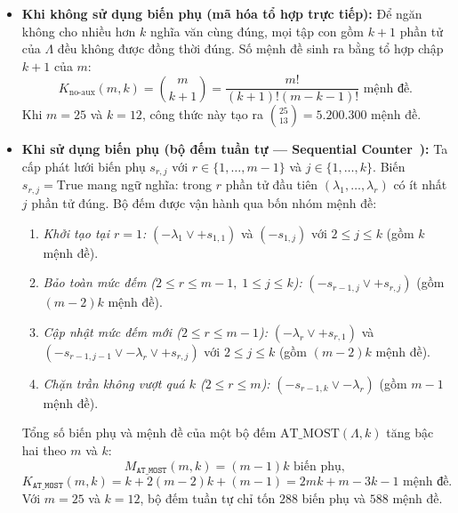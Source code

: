 \begin{itemize}
    \item \textbf{Khi không sử dụng biến phụ (mã hóa tổ hợp trực tiếp):} Để ngăn không cho nhiều hơn $k$ nghĩa văn cùng đúng, mọi tập con gồm $k + 1$ phần tử của $\Lambda$ đều không được đồng thời đúng. Số mệnh đề sinh ra bằng tổ hợp chập $k + 1$ của $m$:
    \begin{equation}
        K_{\text{no-aux}}(m, k) = \binom{m}{k + 1} = \frac{m!}{(k + 1)!(m - k - 1)!} \text{ mệnh đề}.
    \end{equation}
    Khi $m = 25$ và $k = 12$, công thức này tạo ra $\binom{25}{13} = 5.200.300$ mệnh đề.

    \item \textbf{Khi sử dụng biến phụ (bộ đếm tuần tự --- Sequential Counter~\cite{sinz2005towards}):} Ta cấp phát lưới biến phụ $s_{r, j}$ với $r \in \{1, \dots, m - 1\}$ và $j \in \{1, \dots, k\}$. Biến $s_{r, j} = \text{True}$ mang ngữ nghĩa: trong $r$ phần tử đầu tiên $(\lambda_1, \dots, \lambda_r)$ có ít nhất $j$ phần tử đúng. Bộ đếm được vận hành qua bốn nhóm mệnh đề:
    \begin{enumerate}
        \item \textit{Khởi tạo tại $r = 1$:} $(-\lambda_1 \lor +s_{1, 1})$ và $(-s_{1, j})$ với $2 \le j \le k$ (gồm $k$ mệnh đề).
        \item \textit{Bảo toàn mức đếm ($2 \le r \le m - 1,\; 1 \le j \le k$):} $(-s_{r-1, j} \lor +s_{r, j})$ (gồm $(m - 2)k$ mệnh đề).
        \item \textit{Cập nhật mức đếm mới ($2 \le r \le m - 1$):} $(-\lambda_r \lor +s_{r, 1})$ và $(-s_{r-1, j-1} \lor -\lambda_r \lor +s_{r, j})$ với $2 \le j \le k$ (gồm $(m - 2)k$ mệnh đề).
        \item \textit{Chặn trần không vượt quá $k$ ($2 \le r \le m$):} $(-s_{r-1, k} \lor -\lambda_r)$ (gồm $m - 1$ mệnh đề).
    \end{enumerate}
    Tổng số biến phụ và mệnh đề của một bộ đếm $\text{AT\_MOST}(\Lambda, k)$ tăng bậc hai theo $m$ và $k$:
    \begin{equation}
        M_{\texttt{AT\_MOST}}(m, k) = (m - 1)k \text{ biến phụ},
    \end{equation}
    \begin{equation}
        K_{\texttt{AT\_MOST}}(m, k) = k + 2(m - 2)k + (m - 1) = 2mk + m - 3k - 1 \text{ mệnh đề}.
    \end{equation}
    Với $m = 25$ và $k = 12$, bộ đếm tuần tự chỉ tốn $288$ biến phụ và $588$ mệnh đề.


\end{itemize}
